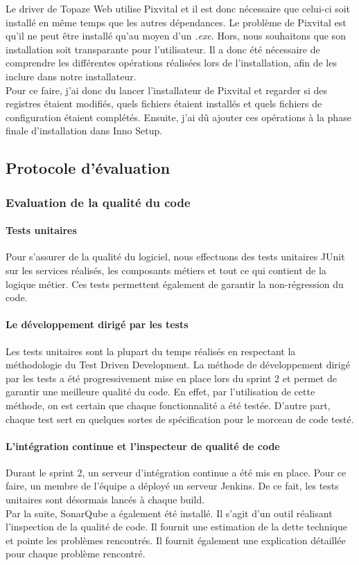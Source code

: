 Le driver de Topaze Web utilise Pixvital et il est donc nécessaire que celui-ci soit installé en même temps que les autres dépendances. Le problème de Pixvital est qu'il ne peut être installé qu'au moyen d'un \textit{.exe}. Hors, nous souhaitons que son installation soit transparante pour l'utilisateur. Il a donc été nécessaire de comprendre les différentes opérations réalisées lors de l'installation, afin de les inclure dans notre installateur.\\
Pour ce faire, j'ai donc du lancer l'installateur de Pixvital et regarder si des registres étaient modifiés, quels fichiers étaient installés et quels fichiers de configuration étaient complétés. Ensuite, j'ai dû ajouter ces opérations à la phase finale d'installation dans Inno Setup.


\subsection{Protocole d'évaluation}
\subsubsection{Evaluation de la qualité du code}
\paragraph*{Tests unitaires\\}
Pour s'assurer de la qualité du logiciel, nous effectuons des tests unitaires JUnit sur les services réalisés, les composants métiers et tout ce qui contient de la logique métier. Ces tests permettent également de garantir la non-régression du code.

\paragraph*{Le développement dirigé par les tests\\}
Les tests unitaires sont la plupart du temps réalisés en respectant la méthodologie du Test Driven Development.
La méthode de développement dirigé par les tests a été progressivement mise en place lors du sprint 2 et permet de garantir une meilleure qualité du code. En effet, par l'utilisation de cette méthode, on est certain que chaque fonctionnalité a été testée. D'autre part, chaque test sert en quelques sortes de spécification pour le morceau de code testé.

\paragraph*{L'intégration continue et l'inspecteur de qualité de code\\} 
Durant le sprint 2, un serveur d'intégration continue a été mis en place. Pour ce faire, un membre de l'équipe a déployé un serveur Jenkins. De ce fait, les tests unitaires sont désormais lancés à chaque build. \\
Par la suite, SonarQube a également été installé. Il s'agit d'un outil réalisant l'inspection de la qualité de code. Il fournit une estimation de la dette technique et pointe les problèmes rencontrés. Il fournit également une explication détaillée pour chaque problème rencontré.

